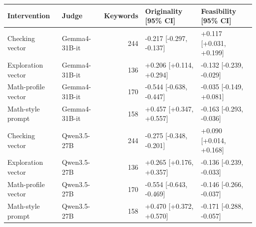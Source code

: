\begin{tabular}{llrll}
\toprule Intervention & Judge & Keywords & Originality [95\% CI] & Feasibility [95\% CI] \\
\midrule
Checking vector & Gemma4-31B-it & 244 & -0.217 [-0.297, -0.137] & +0.117 [+0.031, +0.199] \\
Exploration vector & Gemma4-31B-it & 136 & +0.206 [+0.114, +0.294] & -0.132 [-0.239, -0.029] \\
Math-profile vector & Gemma4-31B-it & 170 & -0.544 [-0.638, -0.447] & -0.035 [-0.149, +0.081] \\
Math-style prompt & Gemma4-31B-it & 158 & +0.457 [+0.347, +0.557] & -0.163 [-0.293, -0.036] \\
Checking vector & Qwen3.5-27B & 244 & -0.275 [-0.348, -0.201] & +0.090 [+0.014, +0.168] \\
Exploration vector & Qwen3.5-27B & 136 & +0.265 [+0.176, +0.357] & -0.136 [-0.239, -0.033] \\
Math-profile vector & Qwen3.5-27B & 170 & -0.554 [-0.643, -0.469] & -0.146 [-0.266, -0.037] \\
Math-style prompt & Qwen3.5-27B & 158 & +0.470 [+0.372, +0.570] & -0.171 [-0.288, -0.057] \\
\bottomrule
\end{tabular}
